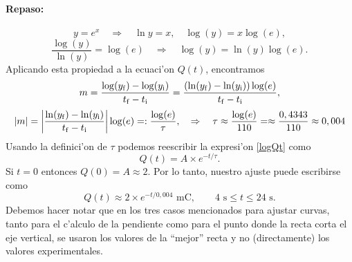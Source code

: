 \paragraph{Repaso: } 
\begin{equation}
y=e^x \quad \Rightarrow\quad \ln y=x, \quad \log(y)=x\log(e),
\end{equation}
\begin{equation}
\frac{\log(y)}{\ln(y)}=\log(e) \quad \Rightarrow\quad \log(y)=\ln(y)\log(e).
\end{equation}
Aplicando esta propiedad a la ecuaci'on $Q(t)$, encontramos
\begin{equation}
m=\frac{\log(y_{\rm f})-\log(y_{\rm i})}{t_{\rm f}-t_{\rm i}}=\frac{(\ln(y_{\rm f})-\ln(y_{\rm i}))\log(e)}{t_{\rm f}-t_{\rm i}},
\end{equation}
\begin{equation}
|m|=\left|\frac{\ln(y_{\rm f})-\ln(y_{\rm i})}{t_{\rm f}-t_{\rm i}}\right|\log(e)=:\frac{\log(e)}{\tau}, \quad\Rightarrow\quad \tau\approx\frac{\log(e)}{110}=\approx\frac{0,4343}{110}\approx 0,004
\end{equation}
Usando la definici'on de $\tau$ podemos reescribir la expresi'on \eqref{logQt} como
\begin{equation}
Q(t)=A\times e^{-t/\tau}.
\end{equation}
Si $t=0$ entonces $Q(0)=A\approx 2$. Por lo tanto, nuestro ajuste puede escribirse como
\begin{equation}
Q(t)\approx 2\times e^{-t/0,004}\text{ mC}, \qquad 4\text{ s}\le t\le 24 \text{ s}.
\end{equation}
Debemos hacer notar que en los tres casos mencionados para ajustar curvas, tanto para el c'alculo de la pendiente como para el punto donde la recta corta el eje vertical, se usaron los valores de la ``mejor'' recta y no (directamente) los valores experimentales.

